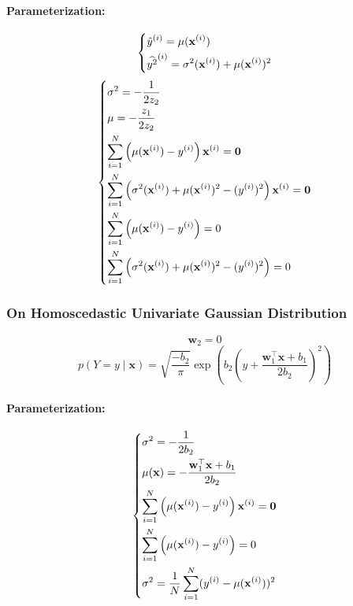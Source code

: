 \documentclass{article}
\begin{document}
\paragraph{Parameterization:}
\[
    \begin{dcases}
        \hat{y}^{(i)} = \mu(\mathbf{x}^{(i)}) \\
        \widehat{y^2}^{(i)} = \sigma^2(\mathbf{x}^{(i)}) + \mu(\mathbf{x}^{(i)})^2 \\
    \end{dcases}
\]
\[
    \begin{dcases}
        \sigma^2 = -\frac{1}{2z_2} \\
        \mu = -\frac{z_1}{2z_2} \\
        \sum_{i=1}^N \left( \mu(\mathbf{x}^{(i)}) - y^{(i)} \right) \mathbf{x}^{(i)} = \mathbf{0} \\
        \sum_{i=1}^N \left( \sigma^2(\mathbf{x}^{(i)}) + \mu(\mathbf{x}^{(i)})^2 - (y^{(i)})^2 \right) \mathbf{x}^{(i)} = \mathbf{0} \\
        \sum_{i=1}^N \left( \mu(\mathbf{x}^{(i)}) - y^{(i)} \right) = 0 \\
        \sum_{i=1}^N \left( \sigma^2(\mathbf{x}^{(i)}) + \mu(\mathbf{x}^{(i)})^2 - (y^{(i)})^2 \right) = 0
    \end{dcases}
\]

\subsubsection{On Homoscedastic Univariate Gaussian Distribution}
\[
    \mathbf{w}_2 = 0
\]
\[
    p(Y=y \mid \mathbf{x}) = \sqrt{\frac{-b_2}{\pi}} \exp\left( b_2 \left( y + \frac{\mathbf{w}_1^\top \mathbf{x} + b_1}{2b_2} \right)^2 \right)
\]
\paragraph{Parameterization:}
\[
    \begin{dcases}
        \sigma^2 = -\frac{1}{2b_2} \\
        \mu(\mathbf{x}) = -\frac{\mathbf{w}_1^\top \mathbf{x} + b_1}{2b_2} \\
        \sum_{i=1}^N \left( \mu(\mathbf{x}^{(i)}) - y^{(i)} \right) \mathbf{x}^{(i)} = \mathbf{0} \\
        \sum_{i=1}^N \left( \mu(\mathbf{x}^{(i)}) - y^{(i)} \right) = 0 \\
        \sigma^2 = \frac{1}{N} \sum_{i=1}^N (y^{(i)} - \mu(\mathbf{x}^{(i)}))^2
    \end{dcases}
\]
\end{document}
